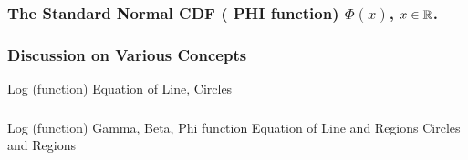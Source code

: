 \documentclass[compress]{beamer}
\newcommand{\sqBullet}[1]{  {\tiny \tiny \tiny \qBoxCol{#1!60}{ }} }
\begin{document}
\begin{frame}\frametitle{The Standard Normal CDF ( PHI function)  $\Phi(x)$, $x\in \mathbb{R}$.}
\begin{center}
\vspace{.4in}
\begin{itemize}



 \end{itemize}
 \end{center}
\vspace{2in}
\end{frame}





\begin{frame}\frametitle{Discussion on Various Concepts}
{\tiny Log (function)
Equation of Line,  Circles 
}
\vspace{3in}
\end{frame}




\begin{frame}\frametitle{}
{\tiny Log (function)
Gamma, Beta, Phi function
Equation of Line and Regions
Circles and Regions
}
\vspace{3in}
\end{frame}


%
%
%	
%	
%			
%
\end{document}
